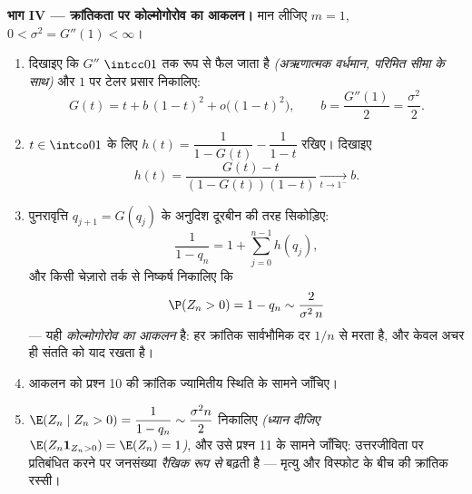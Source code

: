 \begin{problem}
\medskip
\noindent\textbf{भाग IV --- क्रांतिकता पर कोल्मोगोरोव का आकलन।}
मान लीजिए $m = 1$, $0 < \sigma^2 = G''(1) <
\infty$।
\begin{enumerate}[resume]
  \item दिखाइए कि $G''$ $\intcc01$ तक  रूप से फैल जाता है
        \emph{(अऋणात्मक वर्धमान, परिमित सीमा के साथ)} और $1$ पर
        टेलर प्रसार निकालिए:
        \[
        G(t) = t + b\,(1-t)^2 + o\bigl((1-t)^2\bigr),
        \qquad b = \frac{G''(1)}2 = \frac{\sigma^2}2 .
        \]
  \item $t \in \intco01$ के लिए $h(t) = \dfrac1{1 - G(t)} -
        \dfrac1{1 - t}$ रखिए। दिखाइए
        \[
        h(t) = \frac{G(t) - t}{(1 - G(t))(1 - t)}
        \xrightarrow[t\to1^-]{} b .
        \]
  \item पुनरावृत्ति $q_{j+1} = G(q_j)$ के अनुदिश दूरबीन की तरह सिकोड़िए:
        \[
        \frac1{1 - q_n} = 1 + \sum_{j=0}^{n-1}h(q_j),
        \]
        और किसी चेज़ारो तर्क से निष्कर्ष निकालिए कि
        \[
        \P(Z_n > 0) = 1 - q_n \sim \frac{2}{\sigma^2\,n}
        \]
        --- यही \emph{कोल्मोगोरोव का आकलन} है: हर क्रांतिक  सार्वभौमिक दर $1/n$ से मरता है, और केवल अचर ही
        संतति  को याद रखता है।
  \item आकलन को प्रश्न 10 की क्रांतिक ज्यामितीय स्थिति के सामने
        जाँचिए।
  \item $\E(Z_n \mid Z_n > 0) = \dfrac{1}{1 - q_n}
        \sim \dfrac{\sigma^2 n}{2}$ निकालिए \emph{(ध्यान दीजिए $\E(Z_n
        \mathbf 1_{Z_n>0}) = \E(Z_n) = 1$)}, और उसे प्रश्न
        11 के सामने जाँचिए: उत्तरजीविता पर प्रतिबंधित करने पर
        जनसंख्या \emph{रैखिक रूप से} बढ़ती है --- मृत्यु और
        विस्फोट के बीच की क्रांतिक रस्सी।
\end{enumerate}


\end{problem}
